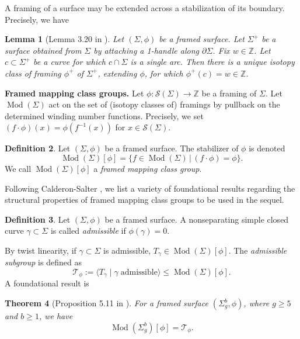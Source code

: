 \documentclass[10pt]{amsart}
\numberwithin{equation}{section}
\theoremstyle{plain}
\newtheorem{theorem}{Theorem}[section]
\newtheorem{lemma}[theorem]{Lemma}
\theoremstyle{definition}
\newtheorem{defn}[theorem]{Definition}
\theoremstyle{remark}
\DeclareMathOperator{\Mod}{Mod}
\begin{document}
A framing of a surface may be extended across a stabilization of its boundary. Precisely, we have 

\begin{lemma}[Lemma 3.20 in \cite{IshanNick}]
Let $(\Sigma,\phi)$ be a framed surface. Let $\Sigma^+$ be a surface obtained from $\Sigma$ by attaching a 1-handle along $\partial \Sigma$. Fix $w \in \mathbb{Z}$. Let $c \subset \Sigma^+$ be a curve for which $c \cap \Sigma$ is a single arc. Then there is a unique isotopy class of framing $\phi^+$ of $\Sigma^+$, extending $\phi$, for which $\phi^+(c) = w \in \mathbb{Z}$.
\label{extendframing}
\end{lemma}





\textbf{Framed mapping class groups.} Let $\phi : \mathcal{S}(\Sigma) \to \mathbb{Z}$ be a framing of $\Sigma$. Let $\Mod(\Sigma)$ act on the set of (isotopy classes of) framings by pullback on the determined winding number functions. Precisely, we set $(f \cdot \phi)(x) = \phi(f^{-1}(x))$ for $x \in \mathcal{S}(\Sigma)$. 

\begin{defn} \label{framedmcg}
Let $(\Sigma,\phi)$ be a framed surface. The stabilizer of $\phi$ is denoted 
\[\Mod(\Sigma)[\phi] = \{f \in \Mod(\Sigma) \,|\, (f\cdot \phi) = \phi\}.\] We call $\Mod(\Sigma)[\phi]$ a \textit{framed mapping class group}.
\end{defn}

Following Calderon-Salter \cite{CalderonSalter}, we list a variety of foundational results regarding the structural properties of framed mapping class groups to be used in the sequel.  

\begin{defn}
Let $(\Sigma,\phi)$ be a framed surface. A nonseparating simple closed curve $\gamma \subset \Sigma$ is called \textit{admissible} if $\phi(\gamma) = 0$. 
\end{defn}

 By twist linearity, if $\gamma \subset \Sigma$ is admissible,  $T_{\gamma} \in \Mod(\Sigma)[\phi]$. The  \textit{admissible subgroup} is defined as \[\mathcal{T}_{\phi} := \langle T_{\gamma} \;|\; \gamma  \; \mathrm{ admissible}\rangle \leq \Mod(\Sigma)[\phi].\] A foundational result is

\begin{theorem}[Proposition 5.11 in \cite{Strata3}] \label{AdmissibleTwists}
For a framed surface $(\Sigma_g^b,\phi)$, where $g \geq 5$ and $b\geq 1$, we have  
\[\Mod(\Sigma_g^b)[\phi] = \mathcal{T}_{\phi}.\]
\end{theorem}
\end{document}
